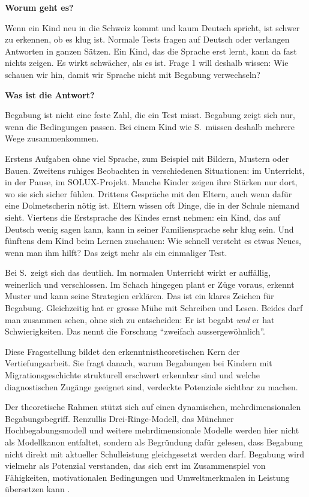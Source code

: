 \documentclass[ngerman, a4paper]{article}
\begin{document}
\begin{frageantwort1}
  \textbf{Worum geht es?}

  Wenn ein Kind neu in die Schweiz kommt und kaum Deutsch spricht, ist
  schwer zu erkennen, ob es klug ist. Normale Tests fragen auf Deutsch
  oder verlangen Antworten in ganzen Sätzen. Ein Kind, das die Sprache
  erst lernt, kann da fast nichts zeigen. Es wirkt schwächer, als es ist.
  Frage 1 will deshalb wissen: Wie schauen wir hin, damit wir Sprache
  nicht mit Begabung verwechseln?

  \medskip
  \textbf{Was ist die Antwort?}

  Begabung ist nicht eine feste Zahl, die ein Test misst. Begabung zeigt
  sich nur, wenn die Bedingungen passen. Bei einem Kind wie S.~müssen
  deshalb mehrere Wege zusammenkommen.

  Erstens Aufgaben ohne viel Sprache, zum Beispiel mit Bildern, Mustern
  oder Bauen. Zweitens ruhiges Beobachten in verschiedenen Situationen:
  im Unterricht, in der Pause, im SOLUX-Projekt. Manche Kinder zeigen
  ihre Stärken nur dort, wo sie sich sicher fühlen. Drittens Gespräche
  mit den Eltern, auch wenn dafür eine Dolmetscherin nötig ist. Eltern
  wissen oft Dinge, die in der Schule niemand sieht. Viertens die
  Erstsprache des Kindes ernst nehmen: ein Kind, das auf Deutsch wenig
  sagen kann, kann in seiner Familiensprache sehr klug sein. Und
  fünftens dem Kind beim Lernen zuschauen: Wie schnell versteht es
  etwas Neues, wenn man ihm hilft? Das zeigt mehr als ein einmaliger
  Test.

  Bei S.~zeigt sich das deutlich. Im normalen Unterricht wirkt er
  auffällig, weinerlich und verschlossen. Im Schach hingegen plant er
  Züge voraus, erkennt Muster und kann seine Strategien erklären. Das
  ist ein klares Zeichen für Begabung. Gleichzeitig hat er grosse Mühe
  mit Schreiben und Lesen. Beides darf man zusammen sehen, ohne sich
  zu entscheiden: Er ist begabt \emph{und} er hat Schwierigkeiten. Das
  nennt die Forschung \enquote{zweifach aussergewöhnlich}.
\end{frageantwort1}

Diese Fragestellung bildet den erkenntnistheoretischen Kern der Vertiefungsarbeit. Sie
fragt danach, warum Begabungen bei Kindern mit Migrationsgeschichte strukturell
erschwert erkennbar sind und welche diagnostischen Zugänge geeignet sind, verdeckte Potenziale
sichtbar zu machen.

Der theoretische Rahmen stützt sich auf einen dynamischen,
mehrdimensionalen Begabungsbegriff. Renzullis Drei-Ringe-Modell,
das Münchner Hochbegabungsmodell und weitere mehrdimensionale
Modelle werden hier nicht als Modellkanon entfaltet, sondern als
Begründung dafür gelesen, dass Begabung nicht direkt mit aktueller
Schulleistung gleichgesetzt werden darf. Begabung wird vielmehr als
Potenzial verstanden, das sich erst im Zusammenspiel von Fähigkeiten,
motivationalen Bedingungen und Umweltmerkmalen in Leistung übersetzen
kann \parencite[S.\,204--219]{muelleroppliger2021begabungsmodelle}.
\end{document}
